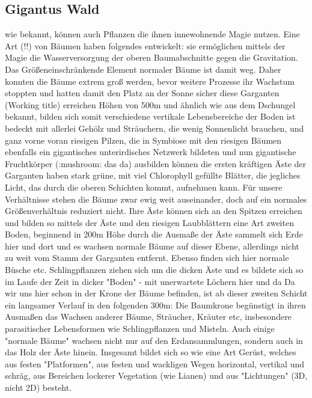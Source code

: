 \subsection{Gigantus Wald} \label{sec:gigantuswald}
\begin{outline}
	\1 wie bekannt, können auch Pflanzen die ihnen innewohnende Magie nutzen. Eine Art (!!) von Bäumen haben folgendes entwickelt: sie ermöglichen mittels der Magie die Wasserversorgung der oberen Baumabschnitte gegen die Gravitation. Das Größeneinschränkende Element normaler Bäume ist damit weg. Daher konnten die Bäume extrem groß werden, bevor weitere Prozesse ihr Wachstum stoppten und hatten damit den Platz an der Sonne sicher
	\1  diese Garganten (Working title) erreichen Höhen von 500m und ähnlich wie aus dem Dschungel bekannt, bilden sich somit verschiedene vertikale Lebensbereiche
	\1 der Boden ist bedeckt mit allerlei Gehölz und Sträuchern, die wenig Sonnenlicht brauchen, und ganz vorne voran riesigen Pilzen, die in Symbiose mit den riesigen Bäumen ebenfalls ein gigantisches unterirdisches Netzwerk bildeten und nun gigantische Fruchtkörper (:mushroom:  das da) ausbilden können
	\1 die ersten kräftigen Äste der Garganten haben stark grüne, mit viel Chlorophyll gefüllte Blätter, die jegliches Licht, das durch die oberen Schichten kommt, aufnehmen kann. Für unsere Verhältnisse stehen die Bäume zwar ewig weit auseinander, doch auf ein normales Größenverhältnis reduziert nicht. Ihre Äste können sich an den Spitzen erreichen und bilden so mittels der Äste und den riesigen Laubblättern eine Art zweiten Boden, beginnend in 200m Höhe
	\1 durch die Ausmaße der Äste sammelt sich Erde hier und dort und es wachsen normale Bäume auf dieser Ebene, allerdings nicht zu weit vom Stamm der Garganten entfernt. Ebenso finden sich hier normale Büsche etc. Schlingpflanzen ziehen sich um die dicken Äste und es bildete sich so im Laufe der Zeit in dicker "Boden" - mit unerwartete Löchern hier und da
	\1 Da wir uns hier schon in der Krone der Bäume befinden, ist ab dieser zweiten Schicht ein langsamer Verlauf in den folgenden 300m: Die Baumkrone begünstigt in ihren Ausmaßen das Wachsen anderer Bäume, Sträucher, Kräuter etc, insbesondere parasitischer Lebensformen wie Schlingpflanzen und Misteln. Auch einige "normale Bäume" wachsen nicht nur auf den Erdansammlungen, sondern auch in das Holz der Äste hinein. Insgesamt bildet sich so wie eine Art Gerüst, welches aus festen "Platformen", aus festen und wackligen Wegen horizontal, vertikal und schräg, aus Bereichen lockerer Vegetation (wie Lianen) und aus "Lichtungen" (3D, nicht 2D) besteht.

\end{outline}
